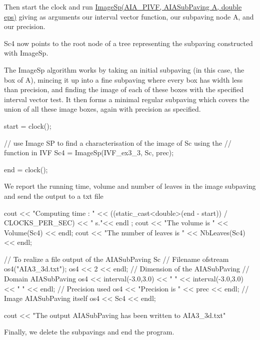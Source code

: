 \-Then start the clock and run \hyperlink{AIAsubpaving_8cpp_a6df9f8ffe0d5fbd9ec10bd6954b3b800}{\-Image\-Sp(\-A\-I\-A\-\_\-\-P\-I\-V\-F, A\-I\-A\-Sub\-Paving A, double eps)} giving as arguments our interval vector function, our subpaving node \-A, and our precision.

\-Sc4 now points to the root node of a tree representing the subpaving constructed with \-Image\-Sp.

\-The \-Image\-Sp algorithm works by taking an initial subpaving (in this case, the box of \-A), mincing it up into a fine subpaving where every box has width less than precision, and finding the image of each of these boxes with the specified interval vector test. \-It then forms a minimal regular subpaving which covers the union of all these image boxes, again with precision as specified.


\begin{DoxyCodeInclude}
  start = clock();

  // use Image SP to find a characterisation of the image of Sc using the 
  // function in IVF
  Sc4 = ImageSp(IVF_ex3_3, Sc, prec);

  end = clock();

\end{DoxyCodeInclude}


\-We report the running time, volume and number of leaves in the image subpaving and send the output to a txt file


\begin{DoxyCodeInclude}
  cout << "Computing time : " 
       << ((static_cast<double>(end - start)) / CLOCKS_PER_SEC) << " s."<< endl
      ;
  cout << "The volume is " << Volume(Sc4) << endl;
  cout << "The number of leaves is " << NbLeaves(Sc4) << endl;

  // To realize a file output of the AIASubPaving Sc
                    // Filename
  ofstream os4("AIA3_3d.txt");
  os4 << 2 << endl; // Dimension of the AIASubPaving
                    // Domain AIASubPaving
  os4 << interval(-3.0,3.0) << " "
    << interval(-3.0,3.0) << " " << endl;
                    // Precision used
  os4 << "Precision is " << prec << endl;
                    // Image AIASubPaving itself
  os4 << Sc4 << endl;

  cout << "The output AIASubPaving has been written to AIA3_3d.txt" 

\end{DoxyCodeInclude}


\-Finally, we delete the subpavings and end the program.


